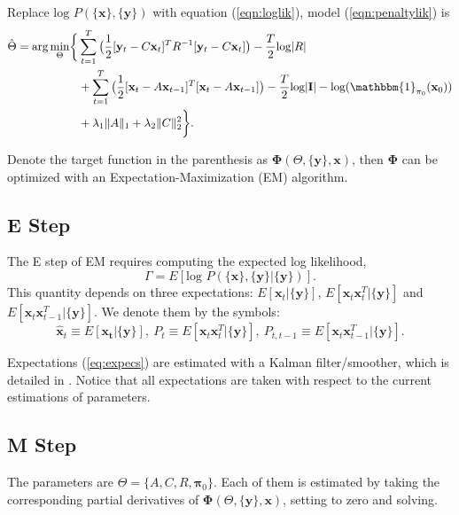 \documentclass[fleqn]{article}
\let\oldref\ref
\renewcommand{\ref}[1]{(\oldref{#1})}
\newcommand{\T}{T}
\begin{document}
Replace $\text{log } P(\{\mathbf{x}\},\{\mathbf{y}\})$ with equation \ref{eqn:loglik}, model \ref{eqn:penaltylik} is
\begin{equation}\label{eqn:penaltylik2}
\begin{split}
\hat{\Theta}=\text{arg}\min_{\substack{\Theta}}\biggl\{&\sum\limits_{t=1}^{T}\big(\frac{1}{2}[\mathbf{y}_t-C\mathbf{x}_t]^{\T}R^{-1}[\mathbf{y}_t-C\mathbf{x}_t]\big)-\frac{T}{2}\text{log}|R|\\
&+\sum\limits_{t=1}^{T}\big(\frac{1}{2}[\mathbf{x}_t-A\mathbf{x}_{t-1}]^{\T}[\mathbf{x}_t-A\mathbf{x}_{t-1}]\big)-\frac{T}{2}\text{log}|\mathbf{I}| - \text{log}(\mathbbm{1}_{\mathbf{\pi}_0}(\mathbf{x}_0))\\
&+\lambda_1\|A\|_1+\lambda_2\|C\|_2^2\biggr\}.
\end{split}
\end{equation}

Denote the target function in the parenthesis as $\mathbf{\Phi}(\Theta,\{\mathbf{y}\},\mathbf{x})$, then $\mathbf{\Phi}$ can be optimized with an Expectation-Maximization (EM) algorithm.

\subsection{E Step}
The E step of EM requires computing the expected log likelihood,
\[
    \Gamma = E[\text{log }P(\{\mathbf{x}\},\{\mathbf{y}\}|\{\mathbf{y}\})].
\]
This quantity depends on three expectations: $E[\mathbf{x}_t|\{\mathbf{y}\}]$, $E[\mathbf{x}_t\mathbf{x}_t^{\T}|\{\mathbf{y}\}]$ and $E[\mathbf{x}_t\mathbf{x}_{t-1}^{\T}|\{\mathbf{y}\}]$. We denote them by the symbols:
\begin{equation}\label{eq:expecs}
\hat{\mathbf{x}}_t \equiv E[\mathbf{x_t}|\{\mathbf{y}\}],\  P_t  \equiv E[\mathbf{x}_t\mathbf{x}_t^{\T}|\{\mathbf{y}\}],\  P_{t,t-1}  \equiv E[\mathbf{x}_t\mathbf{x}_{t-1}^{\T}|\{\mathbf{y}\}].
\end{equation}

Expectations \ref{eq:expecs} are estimated with a Kalman filter/smoother, which is detailed in . Notice that all expectations are taken with respect to the current estimations of parameters.
\subsection{M Step}
The parameters are $\Theta =\{A,C,R,\mathbf{\pi}_0\}$. Each of them is estimated by taking the corresponding partial derivatives of $\mathbf{\Phi}(\Theta,\{\mathbf{y}\},\mathbf{x})$, setting to zero and solving.
\end{document}
